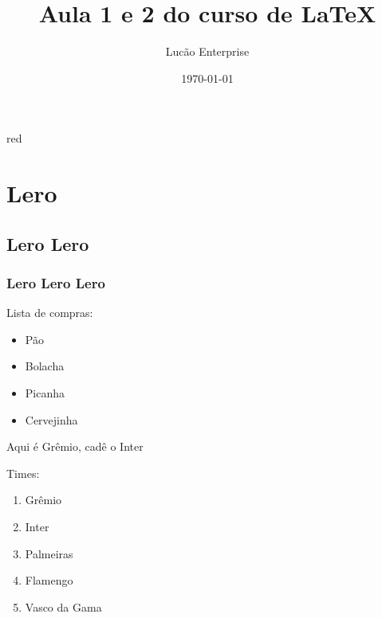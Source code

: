 \documentclass[12pt]{article}
\title{Aula 1 e 2 do curso de \LaTeX}
\author{Lucão Enterprise}
\date{\today}
\begin{document}
	\maketitle
	
	
	\begin{color}{red}
		\lipsum[1]
	\end{color}
	
	\renewcommand{\contentsname}{Coisarada}
	\tableofcontents
	
	\section{Lero}
	\subsection{Lero Lero}
	\subsubsection{Lero Lero Lero}
	
	Lista de compras:
	\begin{itemize}
		\item  Pão
		\item Bolacha
		\item Picanha
		\item Cervejinha
	\end{itemize}
	
	Aqui é {\huge Grêmio}, cadê o {\tiny Inter}
	
	Times:
	\begin{enumerate}
		\item Grêmio
		\item Inter
		\item Palmeiras
		\item Flamengo
		\item Vasco da Gama
	\end{enumerate}
	
	\huge{}
\end{document}
